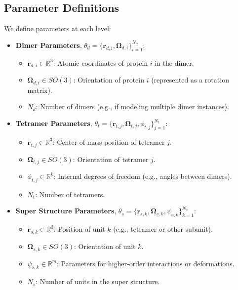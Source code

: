\documentclass{article}
\begin{document}
\subsection{Parameter Definitions}
We define parameters at each level:
\begin{itemize}
    \item \textbf{Dimer Parameters}, \(\theta_d = \{\mathbf{r}_{d,i}, \mathbf{\Omega}_{d,i}\}_{i=1}^{N_d}\):
    \begin{itemize}
        \item \(\mathbf{r}_{d,i} \in \mathbb{R}^3\): Atomic coordinates of protein \(i\) in the dimer.
        \item \(\mathbf{\Omega}_{d,i} \in SO(3)\): Orientation of protein \(i\) (represented as a rotation matrix).
        \item \(N_d\): Number of dimers (e.g., if modeling multiple dimer instances).
    \end{itemize}
    \item \textbf{Tetramer Parameters}, \(\theta_t = \{\mathbf{r}_{t,j}, \mathbf{\Omega}_{t,j}, \phi_{t,j}\}_{j=1}^{N_t}\):
    \begin{itemize}
        \item \(\mathbf{r}_{t,j} \in \mathbb{R}^3\): Center-of-mass position of tetramer \(j\).
        \item \(\mathbf{\Omega}_{t,j} \in SO(3)\): Orientation of tetramer \(j\).
        \item \(\phi_{t,j} \in \mathbb{R}^k\): Internal degrees of freedom (e.g., angles between dimers).
        \item \(N_t\): Number of tetramers.
    \end{itemize}
    \item \textbf{Super Structure Parameters}, \(\theta_s = \{\mathbf{r}_{s,k}, \mathbf{\Omega}_{s,k}, \psi_{s,k}\}_{k=1}^{N_s}\):
    \begin{itemize}
        \item \(\mathbf{r}_{s,k} \in \mathbb{R}^3\): Position of unit \(k\) (e.g., tetramer or other subunit).
        \item \(\mathbf{\Omega}_{s,k} \in SO(3)\): Orientation of unit \(k\).
        \item \(\psi_{s,k} \in \mathbb{R}^m\): Parameters for higher-order interactions or deformations.
        \item \(N_s\): Number of units in the super structure.
    \end{itemize}
\end{itemize}
\end{document}
